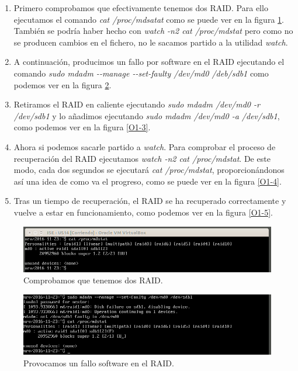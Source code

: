 \documentclass[a4paper,titlepage,12pt]{scrartcl}	%
\numberwithin{figure}{section} %
\numberwithin{table}{section} %
\begin{document}
	\begin{enumerate}
		\item Primero comprobamos que efectivamente tenemos dos RAID. Para ello ejecutamos el comando \textit{cat /proc/mdsatat} como se puede ver en la figura \ref{O1-1}. También se podría haber hecho con \textit{watch -n2 cat /proc/mdstat} pero como no se producen cambios en el fichero, no le sacamos partido a la utilidad \textit{watch}.
		\item A continuación, producimos un fallo por software en el RAID ejecutando el comando \textit{sudo mdadm -{-}manage -{-}set-faulty /dev/md0 /deb/sdb1} como podemos ver en la figura \ref{O1-2}.
		\item Retiramos el RAID en caliente ejecutando \textit{sudo mdadm /dev/md0 -r /dev/sdb1} y lo añadimos ejecutando \textit{sudo mdadm /dev/md0 -a /dev/sdb1}, como podemos ver en la figura \ref{O1-3}.
		\item Ahora si podemos sacarle partido a \textit{watch}. Para comprobar el proceso de recuperación del RAID ejecutamos \textit{watch -n2 cat /proc/mdstat}. De este modo, cada dos segundos se ejecutará \textit{cat /proc/mdstat}, proporcionándonos así una idea de como va el progreso, como se puede ver en la figura \ref{O1-4}.
		\item Tras un tiempo de recuperación, el RAID se ha recuperado correctamente y vuelve a estar en funcionamiento, como podemos ver en la figura \ref{O1-5}.
	\end{enumerate}
	
	\begin{figure}[H]
		\includegraphics[width=\linewidth]{./Imagenes/O1-1.png}
		\vspace{-0.5cm}
		\caption[Comprobamos que tenemos dos RAID.]{Comprobamos que tenemos dos RAID.}
		\label{O1-1}
	\end{figure}
	
	\begin{figure}[H]
		\includegraphics[width=\linewidth]{./Imagenes/O1-2.png}
		\vspace{-0.5cm}
		\caption[Provocamos un fallo software en el RAID.]{Provocamos un fallo software en el RAID.}
		\label{O1-2}
	\end{figure}
	
\end{document}
